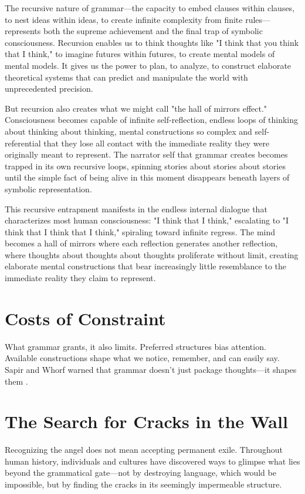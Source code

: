 The recursive nature of grammar—the capacity to embed clauses within clauses, to nest ideas within ideas, to create infinite complexity from finite rules—represents both the supreme achievement and the final trap of symbolic consciousness. Recursion enables us to think thoughts like "I think that you think that I think," to imagine futures within futures, to create mental models of mental models. It gives us the power to plan, to analyze, to construct elaborate theoretical systems that can predict and manipulate the world with unprecedented precision.

But recursion also creates what we might call "the hall of mirrors effect." Consciousness becomes capable of infinite self-reflection, endless loops of thinking about thinking about thinking, mental constructions so complex and self-referential that they lose all contact with the immediate reality they were originally meant to represent. The narrator self that grammar creates becomes trapped in its own recursive loops, spinning stories about stories about stories until the simple fact of being alive in this moment disappears beneath layers of symbolic representation.

This recursive entrapment manifests in the endless internal dialogue that characterizes most human consciousness: "I think that I think," escalating to "I think that I think that I think," spiraling toward infinite regress. The mind becomes a hall of mirrors where each reflection generates another reflection, where thoughts about thoughts about thoughts proliferate without limit, creating elaborate mental constructions that bear increasingly little resemblance to the immediate reality they claim to represent.

\section{Costs of Constraint}

What grammar grants, it also limits. Preferred structures bias attention. Available constructions shape what we notice, remember, and can easily say. Sapir and Whorf warned that grammar doesn’t just package thoughts—it shapes them \parencite{sapir1929status,whorf1956language}.

\section{The Search for Cracks in the Wall}

Recognizing the angel does not mean accepting permanent exile. Throughout human history, individuals and cultures have discovered ways to glimpse what lies beyond the grammatical gate—not by destroying language, which would be impossible, but by finding the cracks in its seemingly impermeable structure.

